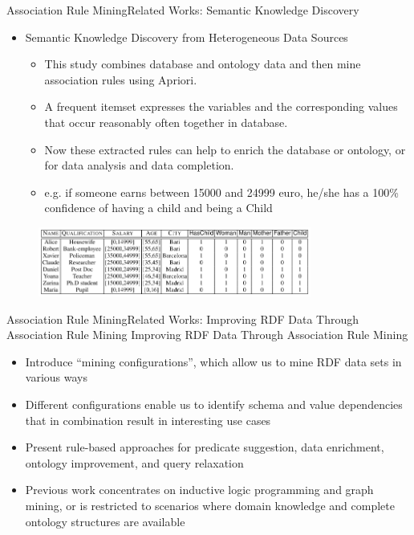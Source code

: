 \documentclass[10pt]{beamer}
\begin{document}
\begin{frame}{Association Rule Mining}{Related Works:  Semantic Knowledge Discovery}
\begin{itemize}
\item Semantic Knowledge Discovery from Heterogeneous Data Sources\cite{d2012semantic}
\begin{itemize}
\item This study combines database and ontology data and then mine association rules using Apriori.
\item A frequent itemset expresses the variables and the corresponding values that occur reasonably often together in database.
\item Now these extracted rules can help to enrich the database or ontology, or for data analysis and data completion.
\item e.g. if someone earns between 15000 and 24999 euro, he/she has a 100\% confidence of having a child and being a Child
\end{itemize}
\end{itemize}
\begin{figure}[H]
	\centering
	\includegraphics[width=0.8\textwidth]{images/Database.PNG}
	\label{fig:Database}
 
\end{figure}
\end{frame}

\begin{frame}{Association Rule Mining}{Related Works:  Improving RDF Data Through Association Rule Mining}
Improving RDF Data Through Association Rule Mining \cite{abedjan2013improving}
\begin{itemize}
	
	\item Introduce “mining configurations”, which allow us to mine RDF data sets in various ways
	\item Different configurations enable us to identify schema and value dependencies that in combination result in interesting use cases
	\item Present rule-based approaches for predicate suggestion, data enrichment, ontology improvement, and query relaxation
	\item Previous work concentrates on inductive logic programming and graph mining, or is restricted to scenarios where domain knowledge and complete ontology structures are available
\end{itemize}
\end{frame}
 
\end{document}
